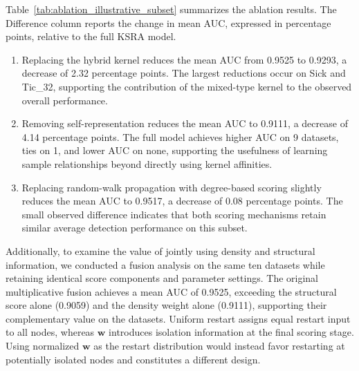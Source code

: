 \documentclass[ASNA,twocolumn]{USG} %
\begin{document}
Table~\ref{tab:ablation_illustrative_subset} summarizes the ablation results. The Difference column reports the change in mean AUC, expressed in percentage points, relative to the full KSRA model.

\begin{enumerate}[\indent (1)]
    \item Replacing the hybrid kernel reduces the mean AUC from 0.9525 to 0.9293, a decrease of 2.32 percentage points. The largest reductions occur on Sick and Tic\_32, supporting the contribution of the mixed-type kernel to the observed overall performance.

    \item Removing self-representation reduces the mean AUC to 0.9111, a decrease of 4.14 percentage points.
    The full model achieves higher AUC on 9 datasets,
    ties on 1, and lower AUC on none, supporting the
    usefulness of learning sample relationships beyond
    directly using kernel affinities.

    \item Replacing random-walk propagation with degree-based
    scoring slightly reduces the mean AUC to 0.9517,
    a decrease of 0.08 percentage points. The small observed
    difference indicates that both scoring mechanisms retain
    similar average detection performance on this subset.
\end{enumerate}

Additionally, to examine the value of jointly using density and structural information, we conducted a fusion analysis on the same ten datasets while retaining identical score components and parameter settings. The original multiplicative fusion achieves a mean AUC of 0.9525, exceeding the structural score alone (0.9059) and the density weight alone (0.9111), supporting their complementary value on the datasets. Uniform restart assigns equal restart input to all nodes, whereas $\boldsymbol w$ introduces isolation information at the final scoring stage. Using normalized $\boldsymbol w$ as the restart distribution would instead favor restarting at potentially isolated nodes and constitutes a different design.
\end{document}
